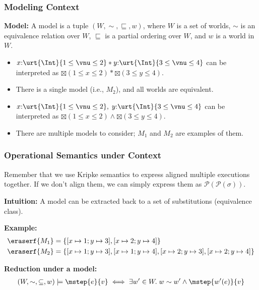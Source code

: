 \begin{frame}[fragile]
    \frametitle{Modeling Context}

\textbf{Model:} A model is a tuple $(W, \sim, \sqsubseteq, w)$, where $W$ is a set of worlds, $\sim$ is an equivalence relation over $W$, $\sqsubseteq$ is a partial ordering over $W$, and $w$ is a world in $W$.

\begin{itemize}
    \item $x{:}\urt{\Int}{1 \leq \vnu \leq 2} * y{:}\urt{\Int}{3 \leq \vnu \leq 4}$ can be interpreted as $\boxtimes (1 \leq x \leq 2) * \boxtimes (3 \leq y \leq 4)$.
    \item There is a single model (i.e., $M_2$), and all worlds are equivalent.
    \item $x{:}\urt{\Int}{1 \leq \vnu \leq 2},\; y{:}\urt{\Int}{3 \leq \vnu \leq 4}$ can be interpreted as $\boxtimes (1 \leq x \leq 2) \land \boxtimes (3 \leq y \leq 4)$.
    \item There are multiple models to consider; $M_1$ and $M_2$ are examples of them.
\end{itemize}

\end{frame}

\begin{frame}[fragile]
    \frametitle{Operational Semantics under Context}

Remember that we use Kripke semantics to express aligned multiple executions together. If we don't align them, we can simply express them as $\mathcal{P}(\mathcal{P}(\sigma))$.

\textbf{Intuition:} A model can be extracted back to a set of substitutions (equivalence class).

\textbf{Example:}
\begin{align*}
&\eraserf{M_1} = \{ [x\mapsto 1; y\mapsto 3], [x\mapsto 2; y\mapsto 4] \}
\\&\eraserf{M_2} = \{ [x\mapsto 1; y\mapsto 3], [x\mapsto 1; y\mapsto 4], [x\mapsto 2; y\mapsto 3], [x\mapsto 2; y\mapsto 4] \}
\end{align*}

\textbf{Reduction under a model:}
\begin{align*}
    (W, \sim, \subseteq, w) \models \mstep{e}{v} \iff \exists w' \in W.\; w \sim w' \land \mstep{w'(e)}{v}
\end{align*}

\end{frame}

